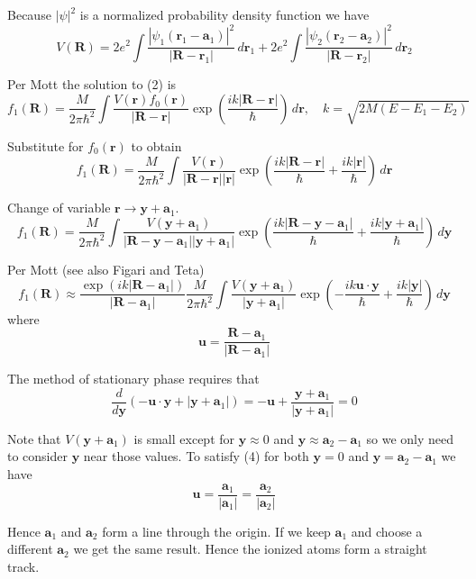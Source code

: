 \documentclass[12pt]{article}
\begin{document}
Because $|\psi|^2$ is a normalized probability density function we have
\begin{equation*}
V(\mathbf R)
=2e^2\int\frac{|\psi_1(\mathbf r_1-\mathbf a_1)|^2}{|\mathbf R-\mathbf r_1|}
\,d\mathbf r_1
+2e^2\int\frac{|\psi_2(\mathbf r_2-\mathbf a_2)|^2}{|\mathbf R-\mathbf r_2|}
\,d\mathbf r_2
\end{equation*}

Per Mott the solution to (2) is
\begin{equation*}
f_1(\mathbf R)=
\frac{M}{2\pi\hbar^2}\int\frac{V(\mathbf r)f_0(\mathbf r)}{|\mathbf R-\mathbf r|}
\exp\left(\frac{ik|\mathbf R-\mathbf r|}{\hbar}\right)\,d\mathbf r,
\quad
k=\sqrt{2M(E-E_1-E_2)}
\end{equation*}

Substitute for $f_0(\mathbf r)$ to obtain
\begin{equation*}
f_1(\mathbf R)=
\frac{M}{2\pi\hbar^2}\int\frac{V(\mathbf r)}{|\mathbf R-\mathbf r||\mathbf r|}
\exp\left(\frac{ik|\mathbf R-\mathbf r|}{\hbar}+\frac{ik|\mathbf r|}{\hbar}\right)\,d\mathbf r
\end{equation*}

Change of variable $\mathbf r\rightarrow\mathbf y+\mathbf a_1$.
\begin{equation*}
f_1(\mathbf R)=
\frac{M}{2\pi\hbar^2}\int
\frac{V(\mathbf y+\mathbf a_1)}{|\mathbf R-\mathbf y-\mathbf a_1||\mathbf y+\mathbf a_1|}
\exp\left(\frac{ik|\mathbf R-\mathbf y-\mathbf a_1|}{\hbar}
+\frac{ik|\mathbf y+\mathbf a_1|}{\hbar}\right)\,d\mathbf y
\end{equation*}

Per Mott (see also Figari and Teta)
\begin{equation*}
f_1(\mathbf R)\approx
\frac{\exp(ik|\mathbf R-\mathbf a_1|)}{|\mathbf R-\mathbf a_1|}
\frac{M}{2\pi\hbar^2}\int\frac{V(\mathbf y+\mathbf a_1)}{|\mathbf y+\mathbf a_1|}
\exp\left(-\frac{ik\mathbf u\cdot\mathbf y}{\hbar}+\frac{ik|\mathbf y|}{\hbar}\right)\,d\mathbf y
\tag{3}
\end{equation*}
where
\begin{equation*}
\mathbf u=\frac{\mathbf R-\mathbf a_1}{|\mathbf R-\mathbf a_1|}
\end{equation*}

The method of stationary phase requires that
\begin{equation*}
\frac{d}{d\mathbf y}\left(-\mathbf u\cdot\mathbf y+|\mathbf y+\mathbf a_1|\right)
=-\mathbf u+\frac{\mathbf y+\mathbf a_1}{|\mathbf y+\mathbf a_1|}=0
\tag{4}
\end{equation*}

Note that $V(\mathbf y+\mathbf a_1)$ is small
except for $\mathbf y\approx0$ and $\mathbf y\approx\mathbf a_2-\mathbf a_1$ so we only need to consider
$\mathbf y$ near those values.
To satisfy (4) for both $\mathbf y=0$ and $\mathbf y=\mathbf a_2-\mathbf a_1$ we have
\begin{equation*}
\mathbf u=\frac{\mathbf a_1}{|\mathbf a_1|}=\frac{\mathbf a_2}{|\mathbf a_2|}
\end{equation*}

Hence $\mathbf a_1$ and $\mathbf a_2$ form a line through the origin.
If we keep $\mathbf a_1$ and choose a different $\mathbf a_2$ we get the same result.
Hence the ionized atoms form a straight track.
\end{document}

